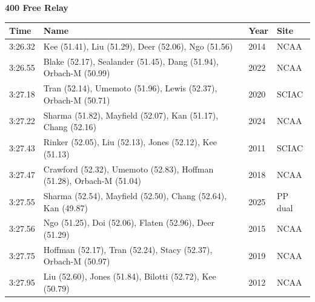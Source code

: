 \noindent\begin{minipage}[t]{0.98\textwidth}
\centering
\textbf{\textcolor{teamprimary}{400 Free Relay}}\par
\vspace{0.5em}
\centering
\small
\renewcommand{\arraystretch}{1.0}
\setlength{\tabcolsep}{4pt}
\begin{tabular}{@{}p{2.7cm}p{4.3cm}p{1.6cm}p{2.7cm}@{}}
\toprule
\textbf{Time} & \textbf{Name} & \textbf{Year} & \textbf{Site} \\
\midrule
3:26.32 & Kee (51.41), Liu (51.29), Deer (52.06), Ngo (51.56) & 2014 & NCAA \\
3:26.55 & Blake (52.17), Sealander (51.45), Dang (51.94), Orbach-M (50.99) & 2022 & NCAA \\
3:27.18 & Tran (52.14), Umemoto (51.96), Lewis (52.37), Orbach-M (50.71) & 2020 & SCIAC \\
3:27.22 & Sharma (51.82), Mayfield (52.07), Kan (51.17), Chang (52.16) & 2024 & NCAA \\
3:27.43 & Rinker (52.05), Liu (52.13), Jones (52.12), Kee (51.13) & 2011 & SCIAC \\
3:27.47 & Crawford (52.32), Umemoto (52.83), Hoffman (51.28), Orbach-M (51.04) & 2018 & NCAA \\
3:27.55 & Sharma (52.54), Mayfield (52.50), Chang (52.64), Kan (49.87) & 2025 & PP dual \\
3:27.56 & Ngo (51.25), Doi (52.06), Flaten (52.96), Deer (51.29) & 2015 & NCAA \\
3:27.75 & Hoffman (52.17), Tran (52.24), Stacy (52.37), Orbach-M (50.97) & 2019 & NCAA \\
3:27.95 & Liu (52.60), Jones (51.84), Bilotti (52.72), Kee (50.79) & 2012 & NCAA \\
\bottomrule
\end{tabular}
\end{minipage}
\vspace{1.2em}
